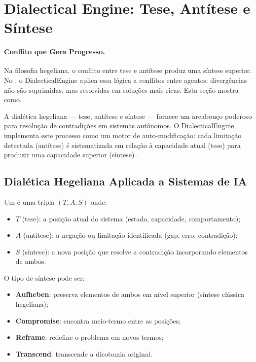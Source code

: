 \section{Dialectical Engine: Tese, Antítese e Síntese}
\label{sec:dialectical-engine}
\nivelphd

\paragraph{Conflito que Gera Progresso.}
Na filosofia hegeliana, o conflito entre tese e antítese
produz uma síntese superior. No \opencodeeco{}, o
DialecticalEngine aplica essa lógica a conflitos entre
agentes: divergências não são suprimidas, mas resolvidas
em soluções mais ricas. Esta seção mostra como.

A dialética hegeliana — tese, antítese e síntese — fornece um
arcabouço poderoso para resolução de contradições em sistemas
autônomos. O DialecticalEngine implementa este processo como um motor
de auto-modificação: cada limitação detectada (antítese) é
sistematizada em relação à capacidade atual (tese) para produzir uma
capacidade superior (síntese) \cite{opencode2026spec036}.

\subsection{Dialética Hegeliana Aplicada a Sistemas de IA}

\begin{definicao}
Um  é uma tripla
$(T, A, S)$ onde:
\begin{itemize}
\item $T$ (tese): a posição atual do sistema (estado, capacidade,
comportamento);
\item $A$ (antítese): a negação ou limitação identificada (gap,
erro, contradição);
\item $S$ (síntese): a nova posição que resolve a contradição
incorporando elementos de ambos.
\end{itemize}
O tipo de síntese pode ser:
\begin{itemize}
\item \textbf{Aufheben}: preserva elementos de ambos em nível superior
(síntese clássica hegeliana);
\item \textbf{Compromise}: encontra meio-termo entre as posições;
\item \textbf{Reframe}: redefine o problema em novos termos;
\item \textbf{Transcend}: transcende a dicotomia original.
\end{itemize}
\end{definicao}

